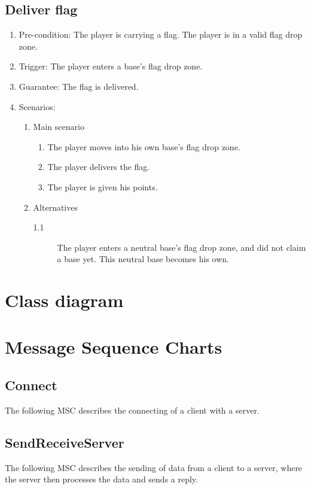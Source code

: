 \documentclass[a4paper,twoside,11pt]{article}
\begin{document}
\subsection*{Deliver flag}
\begin{enumerate}
\item Pre-condition: The player is carrying a flag. The player is in a valid flag drop zone.
\item Trigger: The player enters a base's flag drop zone.
\item Guarantee: The flag is delivered.
\item Scenarios: 
	\begin{enumerate}
	\item Main scenario
		\begin{enumerate}[1)]
		\item The player moves into his own base's flag drop zone.
		\item The player delivers the flag.
		\item The player is given his points.
		\end{enumerate}
	\item Alternatives
		\begin{description}
		\item[1.1] The player enters a neutral base's flag drop zone, 			and did	not claim a base yet. This neutral base becomes his 			own.
		\end{description}
	\end{enumerate}
\end{enumerate}
\section{Class diagram}

\section{Message Sequence Charts}
\subsection{Connect}
The following MSC describes the connecting of a client with a server.


\subsection{SendReceiveServer}
The following MSC describes the sending of data from a client to a server, where the server then processes the data and sends a reply.
\end{document}
